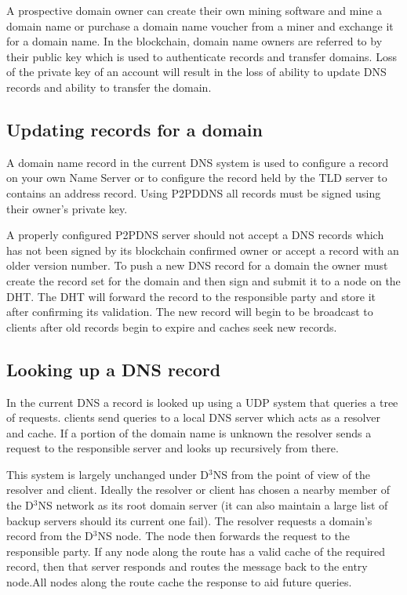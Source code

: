 \documentclass[11pt]{IEEEtran} %
\begin{document}
A prospective domain owner can create their own mining software and mine a domain name or purchase a domain name voucher from a miner and exchange it for a domain name. In the blockchain, domain name owners are referred to by their public key which is used to authenticate records and transfer domains. Loss of the private key of an account will result in the loss of ability to update DNS records and ability to transfer the domain. 


\subsection{Updating records for a domain}
A domain name record in the current DNS system is used to configure a record on your own Name Server or to configure the record held by the TLD server to contains an address record. Using P2PDDNS all records must be signed using their owner's private key. 

A properly configured P2PDNS server should not accept a DNS records which has not been signed by its blockchain confirmed owner or accept a record with an older version number. To push a new DNS record for a domain the owner must create the record set for the domain and then sign and submit it to a node on the DHT. The DHT will forward the record to the responsible party and store it after confirming its validation. The new record will begin to be broadcast to clients after old records begin to expire and caches seek new records.

\subsection{Looking up a DNS record}
In the current DNS a record is looked up using a UDP system that queries a tree of requests. clients send queries to  a local DNS server which acts as a resolver and cache. If a portion of the domain name is unknown the resolver sends a request to the responsible server and looks up recursively from there.

This system is largely unchanged under D$^{3}$NS from the point of view of the resolver and client. Ideally the resolver or client has chosen a nearby member of the D$^{3}$NS network as its root domain server (it can also maintain a large list of backup servers should its current one fail). The resolver requests a domain’s record from the D$^{3}$NS node. The node then forwards the request to the responsible party. If any node along the route has a valid cache of the required record, then that server responds and routes the message back to the entry node.All nodes along the route cache the response to aid future queries.
\end{document}
